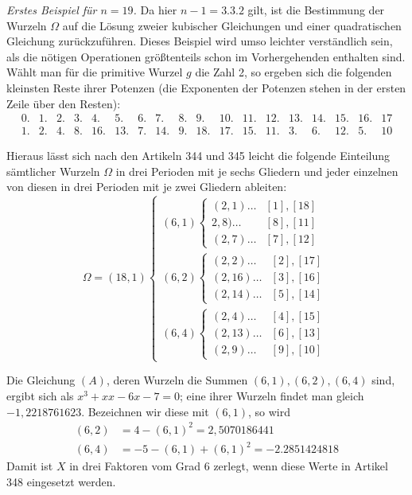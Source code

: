 \textit{Erstes Beispiel für \(n=19\).} Da hier \(n-1=3.3.2\) gilt, ist die Bestimmung der Wurzeln \(\Omega\) auf die Lösung zweier kubischer Gleichungen und einer quadratischen Gleichung zurückzuführen. Dieses Beispiel wird umso leichter verständlich sein, als die nötigen Operationen größtenteils schon im Vorhergehenden enthalten sind. Wählt man für die primitive Wurzel \(g\) die Zahl 2, so ergeben sich die folgenden kleinsten Reste ihrer Potenzen (die Exponenten der Potenzen stehen in der ersten Zeile über den Resten): {\small\setlength{\arraycolsep}{2pt}\[\begin{array}{rrrrrrrrrrrrrrrrrr}0.&1.&2.&3.&4.&5.&6.&7.&8.&9.&10.&11.&12.&13.&14.&15.&16.&17\\1.&2.&4.&8.&16.&13.&7.&14.&9.&18.&17.&15.&11.&3.&6.&12.&5.&10\end{array}\]}

Hieraus lässt sich nach den Artikeln 344 und 345 leicht die folgende Einteilung sämtlicher Wurzeln \(\Omega\) in drei Perioden mit je sechs Gliedern und jeder einzelnen von diesen in drei Perioden mit je zwei Gliedern ableiten: \[\Omega=(18,1)\left\{\begin{array}{l}(6,1)\left\{\begin{array}{ll}(2,1)\ldots&[1],[18]\\2,8)\ldots&[8],[11]\\(2,7)\ldots&[7],[12]\end{array}\right.\\[8pt](6,2)\left\{\begin{array}{ll}(2,2)\ldots&[2],[17]\\(2,16)\ldots&[3],[16]\\(2,14)\ldots&[5],[14]\end{array}\right.\\[8pt](6,4)\left\{\begin{array}{ll}(2,4)\ldots&[4],[15]\\(2,13)\ldots&[6],[13]\\(2,9)\ldots&[9],[10]\end{array}\right.\end{array}\right.\]

Die Gleichung \((A)\), deren Wurzeln die Summen \((6,1),\allowbreak (6,2),\allowbreak (6,4)\) sind, ergibt sich als \(x^3+xx-6x-7=0\); eine ihrer Wurzeln findet man gleich \(-1{,}2218761623\). Bezeichnen wir diese mit \((6,1)\), so wird
\[\begin{aligned}(6,2)&=4-(6,1)^2=2{,}5070186441\\(6,4)&=-5-(6,1)+(6,1)^2=-2.2851424818\end{aligned}\] Damit ist \(X\) in drei Faktoren vom Grad 6 zerlegt, wenn diese Werte in Artikel 348 eingesetzt werden.


